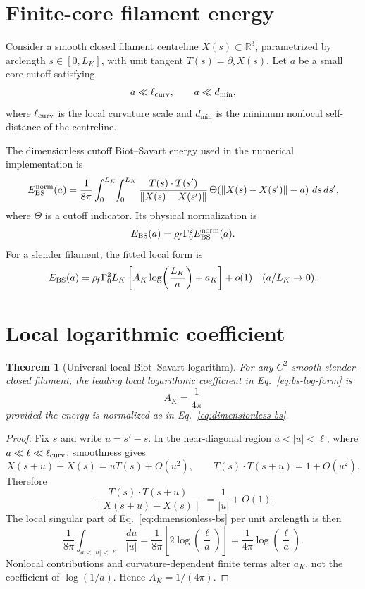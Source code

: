 \documentclass[11pt]{article}
\newcommand{\rhof}{\rho_{\!f}}
\newtheorem{theorem}{Theorem}
\begin{document}
\section{Finite-core filament energy}

Consider a smooth closed filament centreline \(X(s)\subset\mathbb R^3\), parametrized by
arclength \(s\in[0,L_K]\), with unit tangent \(T(s)=\partial_s X(s)\).  Let \(a\) be a small
core cutoff satisfying
\[
  a\ll \ell_{\rm curv},\qquad a\ll d_{\min},
\]
where \(\ell_{\rm curv}\) is the local curvature scale and \(d_{\min}\) is the minimum
nonlocal self-distance of the centreline.

The dimensionless cutoff Biot--Savart energy used in the numerical implementation is
\begin{equation}
  E_{\rm BS}^{\rm norm}(a)
  =
  \frac{1}{8\pi}
  \int_{0}^{L_K}\!\!\int_{0}^{L_K}
  \frac{T(s)\cdot T(s')}{\lVert X(s)-X(s')\rVert}
  \,\Theta\!\left(\lVert X(s)-X(s')\rVert-a\right)\,ds\,ds',
  \label{eq:dimensionless-bs}
\end{equation}
where \(\Theta\) is a cutoff indicator.  Its physical normalization is
\begin{equation}
  E_{\rm BS}(a)
  =
  \rhof\Gamma_0^2
  E_{\rm BS}^{\rm norm}(a).
\end{equation}
For a slender filament, the fitted local form is
\begin{equation}
  E_{\rm BS}(a)
  =
  \rhof\Gamma_0^2 L_K
  \left[
  A_K\log\!\left(\frac{L_K}{a}\right)+a_K
  \right]
  +
  o(1)
  \quad(a/L_K\to0).
  \label{eq:bs-log-form}
\end{equation}

\section{Local logarithmic coefficient}
\label{sec:AK}

\begin{theorem}[Universal local Biot--Savart logarithm]
For any \(C^2\) smooth slender closed filament, the leading local logarithmic coefficient in
Eq.~\eqref{eq:bs-log-form} is
\[
  A_K=\frac{1}{4\pi}
\]
provided the energy is normalized as in Eq.~\eqref{eq:dimensionless-bs}.
\end{theorem}

\begin{proof}
Fix \(s\) and write \(u=s'-s\).  In the near-diagonal region
\(a<|u|<\ell\), where \(a\ll \ell\ll\ell_{\rm curv}\), smoothness gives
\[
  X(s+u)-X(s)=uT(s)+O(u^2),
  \qquad
  T(s)\cdot T(s+u)=1+O(u^2).
\]
Therefore
\[
  \frac{T(s)\cdot T(s+u)}{\lVert X(s+u)-X(s)\rVert}
  =
  \frac{1}{|u|}+O(1).
\]
The local singular part of Eq.~\eqref{eq:dimensionless-bs} per unit arclength is then
\[
  \frac{1}{8\pi}
  \int_{a<|u|<\ell}\frac{du}{|u|}
  =
  \frac{1}{8\pi}
  \left[
  2\log\!\left(\frac{\ell}{a}\right)
  \right]
  =
  \frac{1}{4\pi}\log\!\left(\frac{\ell}{a}\right).
\]
Nonlocal contributions and curvature-dependent finite terms alter \(a_K\), not the coefficient
of \(\log(1/a)\).  Hence \(A_K=1/(4\pi)\).
\end{proof}
\end{document}
